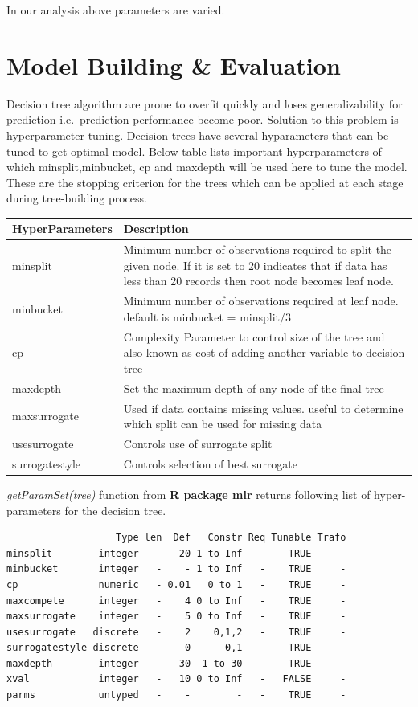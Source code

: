 \documentclass[
]{article}
\begin{document}
In our analysis above parameters are varied.

\newpage

\hypertarget{model-building-evaluation}{%
\section{Model Building \& Evaluation}\label{model-building-evaluation}}

Decision tree algorithm are prone to overfit quickly and loses
generalizability for prediction i.e.~prediction performance become poor.
Solution to this problem is hyperparameter tuning. Decision trees have
several hyparameters that can be tuned to get optimal model. Below table
lists important hyperparameters of which minsplit,minbucket, cp and
maxdepth will be used here to tune the model. These are the stopping
criterion for the trees which can be applied at each stage during
tree-building process.

\begin{table}[H]
\centering
\begin{tabular}[t]{l>{\raggedright\arraybackslash}p{30em}}
\toprule
HyperParameters & Description\\
\midrule
minsplit & Minimum number of observations required to split the given node. If it is set to 20 indicates that if data has less than 20 records then root node becomes leaf
                   node.\\
minbucket & Minimum number of observations required at leaf node. default is minbucket = minsplit/3\\
cp & Complexity Parameter to control size of the tree and also known as cost of adding another variable to decision tree\\
maxdepth & Set the maximum depth of any node of the final tree\\
maxsurrogate & Used if data contains missing values. useful to determine which split can be used for missing data\\
\addlinespace
usesurrogate & Controls use of surrogate split\\
surrogatestyle & Controls selection of best surrogate\\
\bottomrule
\end{tabular}
\end{table}

\emph{getParamSet(tree)} function from \textbf{R package mlr} returns
following list of hyper-parameters for the decision tree.

\begin{verbatim}
                   Type len  Def   Constr Req Tunable Trafo
minsplit        integer   -   20 1 to Inf   -    TRUE     -
minbucket       integer   -    - 1 to Inf   -    TRUE     -
cp              numeric   - 0.01   0 to 1   -    TRUE     -
maxcompete      integer   -    4 0 to Inf   -    TRUE     -
maxsurrogate    integer   -    5 0 to Inf   -    TRUE     -
usesurrogate   discrete   -    2    0,1,2   -    TRUE     -
surrogatestyle discrete   -    0      0,1   -    TRUE     -
maxdepth        integer   -   30  1 to 30   -    TRUE     -
xval            integer   -   10 0 to Inf   -   FALSE     -
parms           untyped   -    -        -   -    TRUE     -
\end{verbatim}
\end{document}
